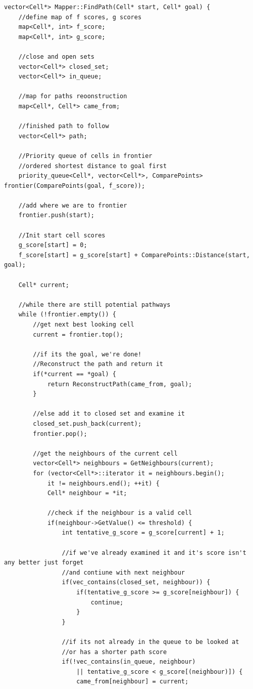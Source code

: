 \documentclass{article}
\begin{document}
\begin{lstlisting}[style=customcpp, caption=A* search algorithm used in path finding and mapping.]
vector<Cell*> Mapper::FindPath(Cell* start, Cell* goal) {
	//define map of f scores, g scores
	map<Cell*, int> f_score;
	map<Cell*, int> g_score;

	//close and open sets
	vector<Cell*> closed_set;
	vector<Cell*> in_queue;

	//map for paths reoonstruction
	map<Cell*, Cell*> came_from;

	//finished path to follow
	vector<Cell*> path;

	//Priority queue of cells in frontier
	//ordered shortest distance to goal first
	priority_queue<Cell*, vector<Cell*>, ComparePoints> frontier(ComparePoints(goal, f_score));

	//add where we are to frontier
	frontier.push(start);

	//Init start cell scores
	g_score[start] = 0;
	f_score[start] = g_score[start] + ComparePoints::Distance(start, goal);

	Cell* current;

	//while there are still potential pathways
	while (!frontier.empty()) {
		//get next best looking cell
		current = frontier.top();

		//if its the goal, we're done!
		//Reconstruct the path and return it
		if(*current == *goal) {
			return ReconstructPath(came_from, goal);
		}

		//else add it to closed set and examine it
		closed_set.push_back(current);
		frontier.pop();

		//get the neighbours of the current cell
		vector<Cell*> neighbours = GetNeighbours(current);
		for (vector<Cell*>::iterator it = neighbours.begin();
			it != neighbours.end(); ++it) {
			Cell* neighbour = *it;

			//check if the neighbour is a valid cell
			if(neighbour->GetValue() <= threshold) {
				int tentative_g_score = g_score[current] + 1;

				//if we've already examined it and it's score isn't any better just forget
				//and contiune with next neighbour
				if(vec_contains(closed_set, neighbour)) {
					if(tentative_g_score >= g_score[neighbour]) {
						continue;
					}
				}

				//if its not already in the queue to be looked at
				//or has a shorter path score
				if(!vec_contains(in_queue, neighbour)
					|| tentative_g_score < g_score[(neighbour)]) {
					came_from[neighbour] = current;


\end{lstlisting}
\end{document}
